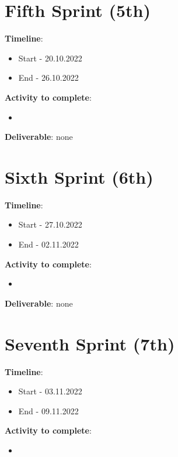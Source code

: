 \section{Fifth Sprint (5th)}
\label{sec:planning_fifth}

\textbf{Timeline}:
\begin{itemize}
    \item Start - 20.10.2022
	\item End - 26.10.2022
\end{itemize}

\textbf{Activity to complete}:
\begin{itemize}
    \item {}
\end{itemize}

\textbf{Deliverable}: none

\section{Sixth Sprint (6th)}
\label{sec:planning_sixth}

\textbf{Timeline}:
\begin{itemize}
    \item Start - 27.10.2022
	\item End - 02.11.2022
\end{itemize}

\textbf{Activity to complete}:
\begin{itemize}
    \item {}
\end{itemize}

\textbf{Deliverable}: none

\section{Seventh Sprint (7th)}
\label{sec:planning_seventh}

\textbf{Timeline}:
\begin{itemize}
    \item Start - 03.11.2022
	\item End - 09.11.2022
\end{itemize}

\textbf{Activity to complete}:
\begin{itemize}
    \item {}
\end{itemize}

